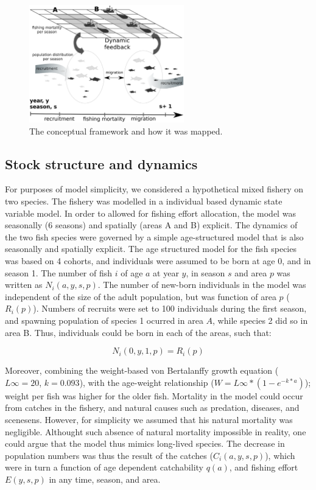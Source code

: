 \documentclass[12pt,oneline,a4paper,numbib]{ouparticle}
\numberwithin{equation}{subsection} %
\begin{document}
\begin{figure}[!h]
\centering
\includegraphics[width=0.6\textwidth]{Figures/Areadynamics.eps} 
\caption{The conceptual framework and how it was mapped.}
\label{fig:MSE}
\end{figure}

\subsection{Stock structure and dynamics}
\label{sec2.1}

For purposes of model simplicity, we considered a hypothetical mixed fishery on two species. The fishery was modelled in a individual based dynamic state variable model. In order to allowed for fishing effort allocation, the model was seasonally (6 seasons) and spatially (areas A and B) explicit. The dynamics of the two fish species were governed by a simple age-structured model that is also seasonally and spatially explicit. The age structured model for the fish species was based on 4 cohorts, and individuals were assumed to be born at age 0, and in season 1. The number of fish $i$ of age $a$ at year $y$, in season $s$ and area $p$ was written as $N_i (a, y, s, p)$. The number of new-born individuals in the model was independent of the size of the adult population, but was function of area $p$ ($R_i (p)$). Numbers of recruits were set to 100 individuals during the first season, and spawning population of species 1 ocurred in area $A$, while species 2 did so in area B. Thus, individuals could be born in each of the areas, such that:  

\begin{equation}
N_i (0, y, 1, p) = R_i (p)
\end{equation}

Moreover, combining the weight-based von Bertalanffy growth equation ($L\infty= 20$, $k= 0.093$), with the age-weight relationship ($W= L\infty*(1-e^{-k*a})$); weight per fish was higher for the older fish. Mortality in the model could occur from catches in the fishery, and natural causes such as predation, diseases, and scenesens. However, for simplicity we assumed that his natural mortality was negligible. Althought such absence of natural mortality impossible in reality, one could argue that the model thus mimics long-lived species. The decrease in population numbers was thus the result of the catches ($C_i (a, y, s, p)$), which were in turn a function of age dependent catchability $q(a)$, and fishing effort $E (y,s,p)$ in any time, season, and area. 
\end{document}
